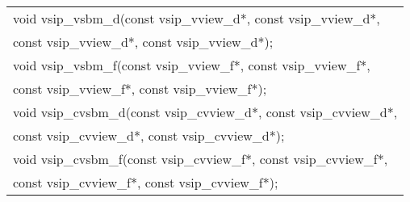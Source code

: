 \\\cvsiplh
\afh
{
\ttfamily
\\\hspace*{.04\textwidth}\begin{tabular}[H]{l}
void vsip\_vsbm\_d(const vsip\_vview\_d*, const vsip\_vview\_d*,
       \\*\hspace{.7cm}const vsip\_vview\_d*, const vsip\_vview\_d*);\\
void vsip\_vsbm\_f(const vsip\_vview\_f*, const vsip\_vview\_f*,
        \\*\hspace{.7cm}const vsip\_vview\_f*, const vsip\_vview\_f*);\\
void vsip\_cvsbm\_d(const vsip\_cvview\_d*, const vsip\_cvview\_d*,
        \\*\hspace{.7cm}const vsip\_cvview\_d*, const vsip\_cvview\_d*);\\
void vsip\_cvsbm\_f(const vsip\_cvview\_f*, const vsip\_cvview\_f*,
        \\*\hspace{.7cm}const vsip\_cvview\_f*, const vsip\_cvview\_f*);\\
\end{tabular}
}
\\\pyjvsiph
{}
